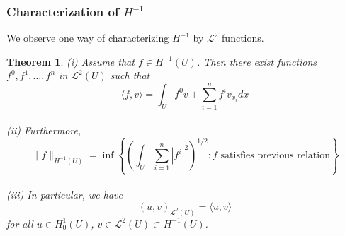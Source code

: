 \documentclass{article}
\begin{document}
\subsubsection{Characterization of $H^{-1}$}

We observe one way of characterizing $H^{-1}$ by $\mathscr{L}^2$ functions.

\newtheorem{Th}{Theorem}
\begin{Th}
    (i) Assume that $f\in H^{-1}(U)$. Then there exist functions $f^0, f^1, \dots, f^n$ in $\mathscr{L}^2(U)$ such that 
    $$
    \langle f,v\rangle =\int_{U}f^0v+\sum\limits_{i=1}^{n}f^iv_{x_i}dx
    $$ \\
    (ii) Furthermore, 
    $$
    \|f\|_{H^{-1}(U)}=\inf\left\{\left(\int_{U}\sum\limits_{i=1}^n\left|f^i\right|^2\right)^{1/2}: f\text{ satisfies previous relation}\right\}
    $$\\
    (iii) In particular, we have 
    $$
    (u,v)_{\mathscr{L}^2(U)}=\langle u,v\rangle
    $$ for all $u\in H^{1}_{0}(U)$, $v\in\mathscr{L}^2(U)\subset H^{-1}(U)$.
\end{Th}
\end{document}
